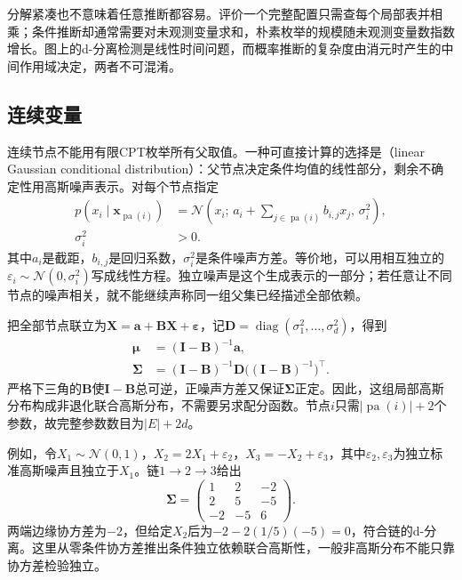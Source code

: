 分解紧凑也不意味着任意推断都容易。评价一个完整配置只需查每个局部表并相乘；条件推断却通常需要对未观测变量求和，朴素枚举的规模随未观测变量数指数增长。图上的d-分离检测是线性时间问题，而概率推断的复杂度由消元时产生的中间作用域决定，两者不可混淆。

\subsection{连续变量}
\label{sec:pgm-directed-continuous}

连续节点不能用有限CPT枚举所有父取值。一种可直接计算的选择是（linear Gaussian conditional distribution）：父节点决定条件均值的线性部分，剩余不确定性用高斯噪声表示。对每个节点指定
\begin{equation}
  \begin{aligned}
    p(x_i\mid\bm{x}_{\operatorname{pa}(i)})
      &=\mathcal N\left(
        x_i;\,a_i+\sum_{j\in\operatorname{pa}(i)}b_{i,j}x_j,\,
        \sigma_i^2\right),\\
    \sigma_i^2&>0.
  \end{aligned}
  \label{eq:pgm-directed-linear-gaussian}
\end{equation}
其中$a_i$是截距，$b_{i,j}$是回归系数，$\sigma_i^2$是条件噪声方差。等价地，可以用相互独立的$\varepsilon_i\sim\mathcal N(0,\sigma_i^2)$写成线性方程。独立噪声是这个生成表示的一部分；若任意让不同节点的噪声相关，就不能继续声称同一组父集已经描述全部依赖。

把全部节点联立为$\bm X=\bm a+\bm B\bm X+\bm\varepsilon$，记$\bm D=\operatorname{diag}(\sigma_1^2,\ldots,\sigma_d^2)$，得到
\[
  \begin{aligned}
    \bm{\mu}&=(\bm I-\bm B)^{-1}\bm a,\\
    \bm{\Sigma}&=(\bm I-\bm B)^{-1}
      \bm D\bigl((\bm I-\bm B)^{-1}\bigr)^{\top}.
  \end{aligned}
\]
严格下三角的$\bm B$使$\bm I-\bm B$总可逆，正噪声方差又保证$\bm\Sigma$正定。因此，这组局部高斯分布构成非退化联合高斯分布，不需要另求配分函数。节点$i$只需$|\operatorname{pa}(i)|+2$个参数，故完整参数数目为$|E|+2d$。

例如，令$X_1\sim\mathcal N(0,1)$，$X_2=2X_1+\varepsilon_2$，$X_3=-X_2+\varepsilon_3$，其中$\varepsilon_2,\varepsilon_3$为独立标准高斯噪声且独立于$X_1$。链$1\to2\to3$给出
\[
  \bm\Sigma=
  \begin{pmatrix}
    1&2&-2\\
    2&5&-5\\
    -2&-5&6
  \end{pmatrix}.
\]
两端边缘协方差为$-2$，但给定$X_2$后为$-2-2(1/5)(-5)=0$，符合链的d-分离。这里从零条件协方差推出条件独立依赖联合高斯性，一般非高斯分布不能只靠协方差检验独立。


